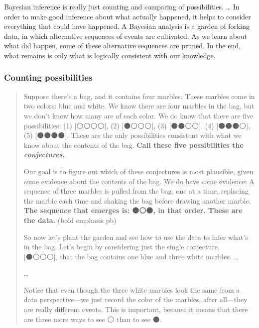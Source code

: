 \documentclass[
  letterpaper,
  DIV=11,
  numbers=noendperiod]{scrreprt}
\begin{document}
\begin{tcolorbox}[enhanced jigsaw, colframe=quarto-callout-tip-color-frame, colback=white, toprule=.15mm, breakable, arc=.35mm, bottomtitle=1mm, colbacktitle=quarto-callout-tip-color!10!white, toptitle=1mm, titlerule=0mm, title=\textcolor{quarto-callout-tip-color}{\faLightbulb}\hspace{0.5em}{Bayesian inference is counting of possibilities}, leftrule=.75mm, opacityback=0, rightrule=.15mm, opacitybacktitle=0.6, bottomrule=.15mm, left=2mm, coltitle=black]

Bayesian inference is really just counting and comparing of
possibilities. \ldots{} In order to make good inference about what
actually happened, it helps to consider everything that could have
happened. A Bayesian analysis is a garden of forking data, in which
alternative sequences of events are cultivated. As we learn about what
did happen, some of these alternative sequences are pruned. In the end,
what remains is only what is logically consistent with our knowledge.

\end{tcolorbox}

\hypertarget{counting-possibilities}{%
\subsubsection{Counting possibilities}\label{counting-possibilities}}

\begin{quote}
Suppose there's a bag, and it contains four marbles. These marbles come
in two colors: blue and white. We know there are four marbles in the
bag, but we don't know how many are of each color. We do know that there
are five possibilities: (1) {[}⚪⚪⚪⚪{]}, (2) {[}⚫⚪⚪⚪{]}, (3)
{[}⚫⚫⚪⚪{]}, (4) {[}⚫⚫⚫⚪{]}, (5) {[}⚫⚫⚫⚫{]}. These are the
only possibilities consistent with what we know about the contents of
the bag. \textbf{Call these five possibilities the \emph{conjectures}.}

Our goal is to figure out which of these conjectures is most plausible,
given some evidence about the contents of the bag. We do have some
evidence: A sequence of three marbles is pulled from the bag, one at a
time, replacing the marble each time and shaking the bag before drawing
another marble. \textbf{The sequence that emerges is: ⚫⚪⚫, in that
order. These are the data.} (bold emphasis pb)

So now let's plant the garden and see how to use the data to infer
what's in the bag. Let's begin by considering just the single
conjecture, {[}⚫⚪⚪⚪{]}, that the bag contains one blue and three
white marbles. \ldots{}

\ldots{}

Notice that even though the three white marbles look the same from a
data perspective---we just record the color of the marbles, after
all---they are really different events. This is important, because it
means that there are three more ways to see ⚪ than to see ⚫.
\end{quote}
\end{document}
